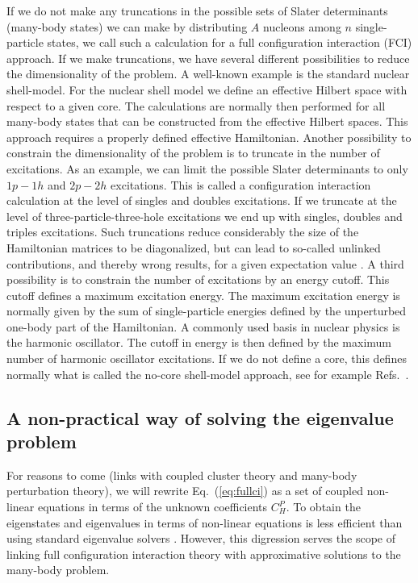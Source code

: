   If we do not make any truncations in the possible sets of Slater
  determinants (many-body states) we can make by distributing $A$
  nucleons among $n$ single-particle states, we call such a
  calculation for a full configuration interaction (FCI) approach.  If
  we make truncations, we have several different possibilities to
  reduce the dimensionality of the problem.  A well-known example is
  the standard nuclear shell-model. For the nuclear shell model we define an
  effective Hilbert space with respect to a given core. The
  calculations are normally then performed for all many-body states
  that can be constructed from the effective Hilbert spaces. This
  approach requires a properly defined effective Hamiltonian.  Another
  possibility to constrain the dimensionality of the problem is to
  truncate in the number of excitations. As an example, we can limit
  the possible Slater determinants to only $1p-1h$ and $2p-2h$
  excitations. This is called a configuration interaction calculation
  at the level of singles and doubles excitations. If we truncate at
  the level of three-particle-three-hole excitations we end up with
  singles, doubles and triples excitations.  Such truncations reduce
  considerably the size of the Hamiltonian matrices to be
  diagonalized, but can lead to so-called unlinked contributions, and
  thereby wrong results, for a given expectation value
  \cite{bartlett2007}.  A third possibility is to constrain the
  number of excitations by an energy cutoff. This cutoff defines a
  maximum excitation energy. The maximum excitation energy is normally given by the 
sum of single-particle energies defined by the unperturbed one-body part of the Hamiltonian.
A commonly used basis in nuclear physics is the harmonic oscillator. The 
cutoff in energy is then defined by the maximum number of harmonic oscillator excitations.
If we do not define a core, this defines normally what is
  called the no-core shell-model approach, see for example Refs.~\cite{navratil2009,navratil2016}.


  \subsection{A non-practical way of solving the eigenvalue problem}

  For reasons to come (links with coupled cluster theory and many-body
  perturbation theory), we will rewrite Eq.~(\ref{eq:fullci}) as a set
  of coupled non-linear equations in terms of the unknown coefficients
  $C_H^P$.  To obtain the eigenstates and eigenvalues in terms of
  non-linear equations is less efficient than using standard eigenvalue solvers \cite{golubvanloan}.
  However, this digression serves the scope
  of linking full configuration interaction theory with approximative
  solutions to the many-body problem.

